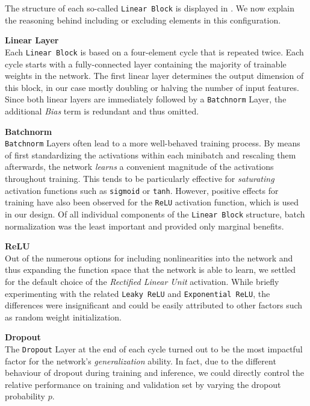 The structure of each so-called \texttt{Linear Block} is displayed in .
We now explain the reasoning behind including or excluding elements in this configuration.

\textbf{Linear Layer} \\
Each \texttt{Linear Block} is based on a four-element cycle that is repeated twice.
Each cycle starts with a fully-connected layer containing the majority of trainable weights in the network.
The first linear layer determines the output dimension of this block, in our case mostly doubling or halving the number of input features.
Since both linear layers are immediately followed by a \texttt{Batchnorm} Layer, the additional \emph{Bias} term is redundant and thus omitted.

\textbf{Batchnorm} \\
\texttt{Batchnorm} Layers \citep{ioffe2015} often lead to a more well-behaved training process.
By means of first standardizing the activations within each minibatch and rescaling them afterwards, the network \emph{learns} a convenient magnitude of the activations throughout training.
This tends to be particularly effective for \emph{saturating} activation functions such as \texttt{sigmoid} or \texttt{tanh}. However, positive effects for training have also been observed for the \texttt{ReLU} activation function, which is used in our design.
Of all individual components of the \texttt{Linear Block} structure, batch normalization was the least important and provided only marginal benefits.

\textbf{ReLU} \\
Out of the numerous options for including nonlinearities into the network and thus expanding the function space that the network is able to learn, we settled for the default choice of the \emph{Rectified Linear Unit} activation.
While briefly experimenting with the related \texttt{Leaky ReLU} and \texttt{Exponential ReLU}, the differences were insignificant and could be easily attributed to other factors such as random weight initialization.

\textbf{Dropout} \label{dropout} \\
The \texttt{Dropout} Layer \citep{srivastava2014} at the end of each cycle turned out to be the most impactful factor for the network's \emph{generalization} ability.
In fact, due to the different behaviour of dropout during training and inference, we could directly control the relative performance on training and validation set by varying the dropout probability $p$.

